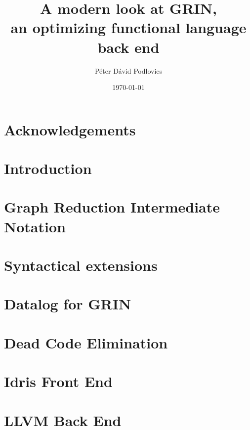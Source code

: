 \documentclass[a4paper]{report}
\begin{document}
	
	\title{A modern look at GRIN,\\ an optimizing functional language back end}
	

	\date{\today}
	\author
	{ 
		Péter Dávid Podlovics
	}
	
	
	
	\tableofcontents
	
	\chapter*{Acknowledgements}
	
	
	\chapter{Introduction} \label{chap:intro}
	
	
	\chapter{Graph Reduction Intermediate Notation} \label{chap:grin}
	
	
	\chapter{Syntactical extensions} \label{chap:extended-syntax}
	
	
	\chapter{Datalog for GRIN} \label{chap:datalog-grin}
	
	
	\chapter{Dead Code Elimination} \label{chap:dce}
	
	
	\chapter{Idris Front End} \label{chap:idris-front-end}
	
	
	\chapter{LLVM Back End} \label{chap:llvm}
	
	
\end{document}

